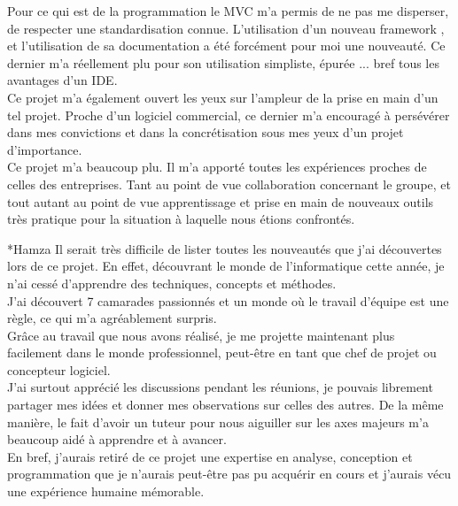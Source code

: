 \documentclass[a4paper, 12pt]{report}
\begin{document}
\begin{chapter}
\begin{section}
		Pour ce qui est de la programmation le MVC m'a permis de ne pas me disperser, de respecter une standardisation connue. L'utilisation d'un 
		nouveau framework , et l'utilisation de sa documentation a été forcément pour moi une nouveauté. Ce dernier m'a réellement plu pour son
		utilisation simpliste, épurée ... bref tous les avantages d'un IDE.\\

		Ce projet m'a également ouvert les yeux sur l'ampleur de la prise en main d'un tel projet. Proche d'un logiciel commercial, ce dernier m'a
		encouragé à persévérer dans mes convictions et dans la concrétisation sous mes yeux d'un projet d'importance.\\ 

		Ce projet m'a beaucoup plu. Il m'a apporté toutes les expériences proches de celles des entreprises. Tant au point de vue collaboration
		concernant le groupe, et tout autant au point de vue apprentissage et prise en main de nouveaux outils très pratique pour la situation à
		laquelle nous étions confrontés.\\
		\end{section}

		\begin{section}*{Hamza}
		Il serait très difficile de lister toutes les nouveautés que j'ai découvertes lors de ce projet.
		En effet, découvrant le monde de l'informatique
		cette année, je n'ai cessé d'apprendre des techniques, concepts et méthodes.\\

		J'ai découvert 7 camarades passionnés et un monde où le travail d'équipe est une règle, ce qui m'a agréablement surpris.\\
		Grâce au travail que nous avons réalisé, je me projette maintenant plus facilement dans le monde professionnel, peut-être en tant
		que chef de projet ou concepteur logiciel.\\

		J'ai surtout apprécié les discussions pendant les réunions, je pouvais librement partager mes idées et donner mes observations sur
		celles des autres. De la même manière, le fait d'avoir un tuteur pour nous aiguiller sur les axes majeurs m'a beaucoup aidé à apprendre
		et à avancer.\\

		En bref, j'aurais retiré de ce projet une expertise en analyse, conception et programmation que je n'aurais peut-être pas pu acquérir en
		cours et j'aurais vécu une expérience humaine mémorable.
		\end{section}


\end{chapter}
\end{document}
